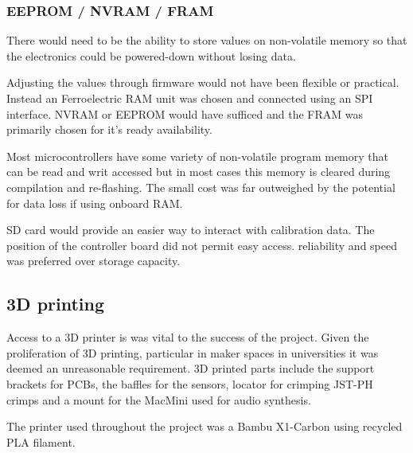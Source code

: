 \subsubsection{EEPROM / NVRAM / FRAM}\label{eeprom-nvram-fram}

There would need to be the ability to store values on non-volatile
memory so that the electronics could be powered-down without losing
data.

Adjusting the values through firmware would not have been flexible or
practical. Instead an Ferroelectric RAM unit was chosen and connected
using an SPI interface. NVRAM or EEPROM would have sufficed and the FRAM
was primarily chosen for it's ready availability.

Most microcontrollers have some variety of non-volatile program memory
that can be read and writ accessed but in most cases this memory is
cleared during compilation and re-flashing. The small cost was far
outweighed by the potential for data loss if using onboard RAM.




SD card would provide an easier way to interact with calibration data.
The position of the controller board did not permit easy access.
reliability and speed was preferred over storage capacity.


\subsection{3D printing}\label{d-printing}

Access to a 3D printer is was vital to the success of the project. Given
the proliferation of 3D printing, particular in maker spaces in
universities it was deemed an unreasonable requirement. 3D printed parts
include the support brackets for PCBs, the baffles for the sensors,
locator for crimping JST-PH crimps and a mount for the MacMini used for
audio synthesis.

The printer used throughout the project was a Bambu X1-Carbon using
recycled PLA filament.

